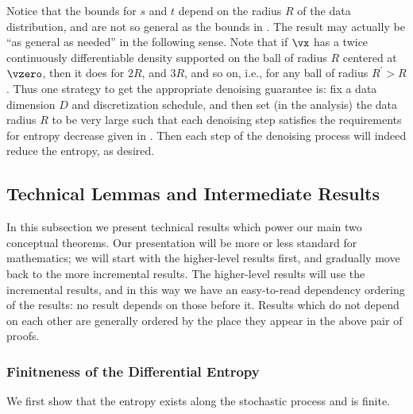 \documentclass[../../book-main.tex]{subfiles}
\begin{document}
Notice that the bounds for \(s\) and \(t\) depend on the radius \(R\) of the data distribution, and are not so general as the bounds in . The result may actually be ``as general as needed'' in the following sense. Note that if \(\vx\) has a twice continuously differentiable density supported on the ball of radius \(R\) centered at \(\vzero\), then it does for \(2R\), and \(3R\), and so on, i.e., for any ball of radius \(R^{\prime} > R\). Thus one strategy to get the appropriate denoising guarantee is: fix a data dimension \(D\) and discretization schedule, and then set (in the analysis) the data radius \(R\) to be very large such that each denoising step satisfies the requirements for entropy decrease given in . Then each step of the denoising process will indeed reduce the entropy, as desired.

 
\subsection{Technical Lemmas and Intermediate Results}\label{sub:app_diffusion_intermediate_results}

In this subsection we present technical results which power our main two conceptual theorems. Our presentation will be more or less standard for mathematics; we will start with the higher-level results first, and gradually move back to the more incremental results. The higher-level results will use the incremental results, and in this way we have an easy-to-read dependency ordering of the results: no result depends on those before it. Results which do not depend on each other are generally ordered by the place they appear in the above pair of proofs. 


\subsubsection{Finitneness of the Differential Entropy}

We first show that the entropy exists along the stochastic process and is finite.
\end{document}
